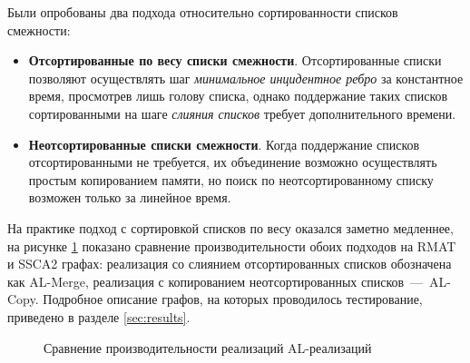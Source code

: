 \documentclass[a4paper,10pt]{extarticle}
\begin{document}
Были опробованы два подхода относительно сортированности списков смежности:
\begin{itemize}
    \item \textbf{Отсортированные по весу списки смежности}. 
        Отсортированные списки позволяют осуществлять шаг \textit{минимальное инцидентное ребро} за константное время, просмотрев лишь голову списка, однако поддержание таких списков сортированными на шаге \textit{слияния списков} требует дополнительного времени.
    \item \textbf{Неотсортированные списки смежности}.
        Когда поддержание списков отсортированными не требуется, их объединение возможно осуществлять простым копированием памяти, но поиск по неотсортированному списку возможен только за линейное время.
\end{itemize}

На практике подход с сортировкой списков по весу оказался заметно медленнее, на рисунке \ref{fig:BorvukaAlCmp} показано сравнение производительности обоих подходов на RMAT и SSCA2 графах: реализация со слиянием отсортированных списков обозначена как AL-Merge, реализация с копированием неотсортированных списков~---~AL-Copy. Подробное описание графов, на которых проводилось тестирование, приведено в разделе \ref{sec:results}.

\noindent \begin{figure}
\centering
{}
\caption{Сравнение производительности реализаций AL-реализаций}
\label{fig:BorvukaAlCmp}
\end{figure}
\end{document}
